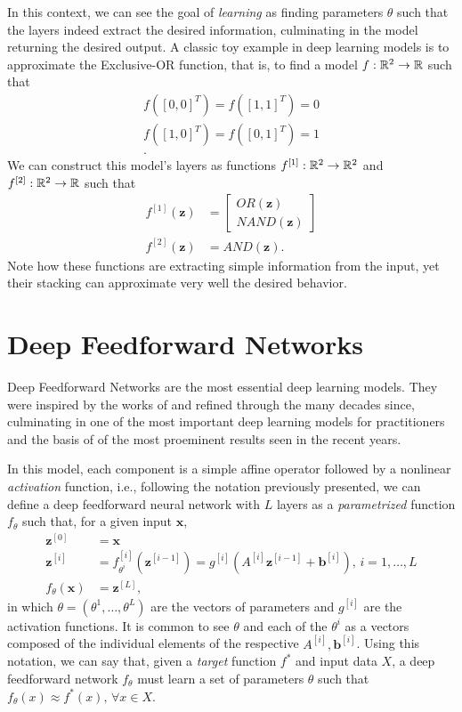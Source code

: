 In this context, we can see the goal of \textit{learning} as finding parameters $\theta$ such that the layers indeed extract the desired information, culminating in the model returning the desired output.
A classic toy example in deep learning models is to approximate the Exclusive-OR function, that is, to find a model $f : \mathbb{R}^2 \to \mathbb{R}$ such that
\begin{align*}
    f([0,0]^T) = f([1,1]^T) = 0 \\
    f([1,0]^T) = f([0,1]^T) = 1 \\
.\end{align*}
We can construct this model's layers as functions $f^{[1]}:\mathbb{R}^2\to\mathbb{R}^2$ and $f^{[2]}:\mathbb{R}^2\to\mathbb{R}$ such that
\begin{align*}
    f^{[1]}(\bm{z}) &= \begin{bmatrix}
    OR(\bm{z}) \\
    NAND(\bm{z})
    \end{bmatrix} \\
    f^{[2]}(\bm{z}) &= AND(\bm{z})
.\end{align*}
Note how these functions are extracting simple information from the input, yet their stacking can approximate very well the desired behavior.

\section{Deep Feedforward Networks}\label{sec:neural-nets}

Deep Feedforward Networks are the most essential deep learning models.
They were inspired by the works of \textcite{rosenblatt_perceptron_1957} and refined through the many decades since, culminating in one of the most important deep learning models for practitioners and the basis of of the most proeminent results seen in the recent years\cite{goodfellow_deep_2016}.

In this model, each component is a simple affine operator followed by a nonlinear \textit{activation} function, i.e., following the notation previously presented, we can define a deep feedforward neural network with $L$ layers as a \textit{parametrized} function $f_\theta$ such that, for a given input $\bm{x}$,
\begin{align*}
    \bm{z}^{[0]} &= \bm{x} \\
    \bm{z}^{[i]} &= f_{\theta^i}^{[i]}(\bm{z}^{[i-1]}) = g^{[i]}\left(A^{[i]}\bm{z}^{[i-1]} + \bm{b}^{[i]}\right) ,\,i=1,\ldots,L \\
    f_\theta(\bm{x}) &= \bm{z}^{[L]}
,\end{align*}
in which $\theta=\left( \theta^1,\ldots,\theta^L \right) $ are the vectors of parameters and $g^{[i]}$ are the activation functions. It is common to see $\theta$ and each of the $\theta^i$ as a vectors composed of the individual elements of the respective $A^{[i]},\bm{b}^{[i]}$. Using this notation, we can say that, given a \textit{target} function $f^*$ and input data $X$, a deep feedforward network $f_\theta$ must learn a set of parameters $\theta$ such that $f_\theta(x) \approx f^*(x),\,\forall x \in X$.

